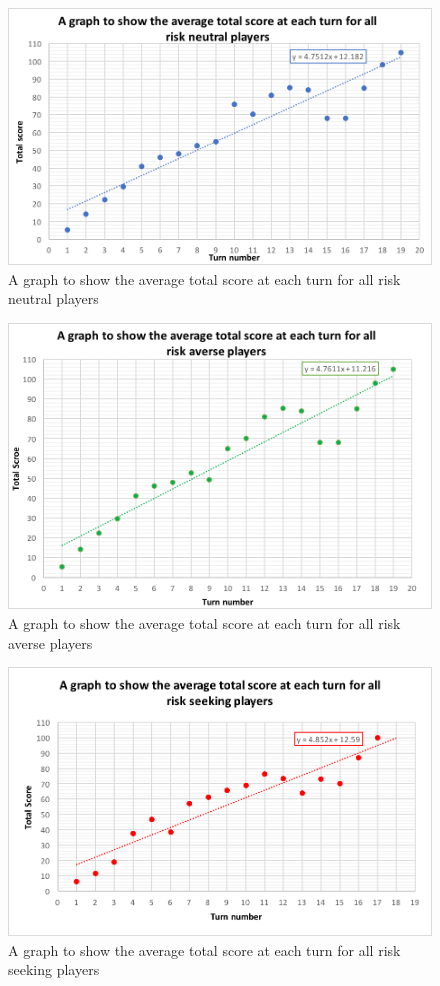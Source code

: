 \documentclass[a4paper,titlepage]{article}
\begin{document}
\begin{figure}
\center
\includegraphics[scale=1]{average_neutral}
\caption{A graph to show the average total score at each turn for all risk neutral players\label{figure10}}
\end{figure}
\begin{figure}
\center
\includegraphics[scale=1]{average_averse}
\caption{A graph to show the average total score at each turn for all risk averse players\label{figure11}}
\end{figure}
\begin{figure}
\center
\includegraphics[scale=1]{average_seeking}
\caption{A graph to show the average total score at each turn for all risk seeking players\label{figure12}}
\end{figure}
\end{document}
